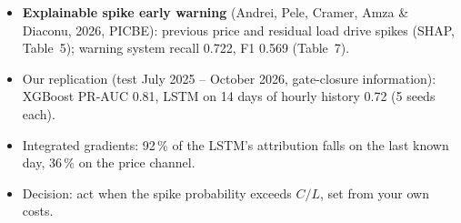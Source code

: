 \begin{itemize}\setlength{\itemsep}{2pt}
  \item \textbf{Explainable spike early warning} (Andrei, Pele, Cramer, Amza \& Diaconu, 2026, PICBE): previous price and residual load drive spikes (SHAP, Table~5); warning system recall 0.722, F1 0.569 (Table~7).
  \item Our replication (test July 2025 -- October 2026, gate-closure information): XGBoost PR-AUC 0.81, LSTM on 14 days of hourly history 0.72 (5 seeds each).
  \item Integrated gradients: 92\,\% of the LSTM's attribution falls on the last known day, 36\,\% on the price channel.
  \item Decision: act when the spike probability exceeds $C/L$, set from your own costs.
\end{itemize}
